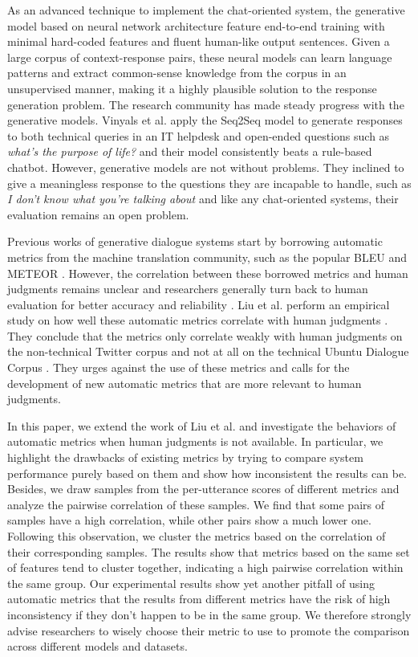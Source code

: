 \documentclass[runningheads]{llncs}
\begin{document}
    As an advanced technique to implement the chat-oriented system, the generative model based on neural network architecture feature end-to-end training with minimal hard-coded features and fluent human-like output sentences. Given a large corpus of context-response pairs, these neural models can learn language patterns and extract common-sense knowledge from the corpus in an unsupervised manner, making it a highly plausible solution to the response generation problem. The research community has made steady progress with the generative models. Vinyals et al. \cite{GoogleChatbot} apply the Seq2Seq model \cite{Seq2Seq} to generate responses to both technical queries in an IT helpdesk and open-ended questions such as \textit{what's the purpose of life?} and their model consistently beats a rule-based chatbot. However, generative models are not without problems. They inclined to give a meaningless response to the questions they are incapable to handle, such as \textit{I don't know what you're talking about} and like any chat-oriented systems, their evaluation remains an open problem.

    Previous works of generative dialogue systems start by borrowing automatic metrics from the machine translation community, such as the popular BLEU \cite{BLEU} and METEOR \cite{METEOR}. However, the correlation between these borrowed metrics and human judgments remains unclear and researchers generally turn back to human evaluation for better accuracy and reliability \cite{Shang,DCGM,VHRED}. Liu et al. perform an empirical study on how well these automatic metrics correlate with human judgments \cite{HowNot}. They conclude that the metrics only correlate weakly with human judgments on the non-technical Twitter corpus and not at all on the technical Ubuntu Dialogue Corpus \cite{ubuntu_corpus}. They urges against the use of these metrics and calls for the development of new automatic metrics that are more relevant to human judgments.

    In this paper, we extend the work of Liu et al. and investigate the behaviors of automatic metrics when human judgments is not available. In particular, we highlight the drawbacks of existing metrics by trying to compare system performance purely based on them and show how inconsistent the results can be. Besides, we draw samples from the per-utterance scores of different metrics and analyze the pairwise correlation of these samples. We find that some pairs of samples have a high correlation, while other pairs show a much lower one. Following this observation, we cluster the metrics based on the correlation of their corresponding samples. The results show that metrics based on the same set of features tend to cluster together, indicating a high pairwise correlation within the same group. Our experimental results show yet another pitfall of using automatic metrics that the results from different metrics have the risk of high inconsistency if they don't happen to be in the same group. We therefore strongly advise researchers to wisely choose their metric to use to promote the comparison across different models and datasets.
\end{document}
